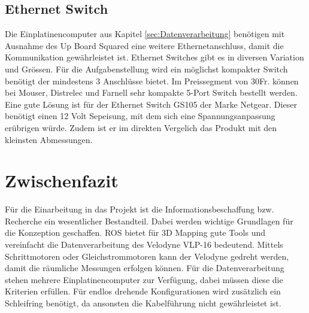 \subsection{Ethernet Switch}
\label{subsec:Ethernetswitch}
Die Einplatinencomputer aus Kapitel \ref{sec:Datenverarbeitung} benötigen mit Ausnahme des Up Board Squared eine weitere Ethernetanschluss, damit die Kommunikation gewährleistet ist. Ethernet Switches gibt es in diversen Variation und Grössen. Für die Aufgabenstellung wird ein möglichst kompakter Switch benötigt der mindestens 3 Anschlüsse bietet. Im Preissegment von 30Fr. können bei Mouser, Distrelec und Farnell sehr kompakte 5-Port Switch bestellt werden. Eine gute Lösung ist für der Ethernet Switch GS105 der Marke Netgear. Dieser benötigt einen 12 Volt Sepeisung, mit dem sich eine Spannungsanpassung erübrigen würde. Zudem ist er im direkten Vergelich das Produkt mit den kleinsten Abmessungen.

\section{Zwischenfazit}
\label{ZwischenfazitInfo}
Für die Einarbeitung in das Projekt ist die Informationsbeschaffung bzw. Recherche ein wesentlicher Bestandteil. Dabei werden wichtige Grundlagen für die Konzeption geschaffen. ROS bietet für 3D Mapping gute Tools und vereinfacht die Datenverarbeitung des Velodyne VLP-16 bedeutend. Mittels Schrittmotoren oder Gleichstrommotoren kann der Velodyne gedreht werden, damit die räumliche Messungen erfolgen können. Für die Datenverarbeitung stehen mehrere Einplatinencomputer zur Verfügung, dabei müssen diese die Kriterien erfüllen. Für endlos drehende Konfigurationen wird zusätzlich ein Schleifring benötigt, da ansonsten die Kabelführung nicht gewährleistet ist.  

